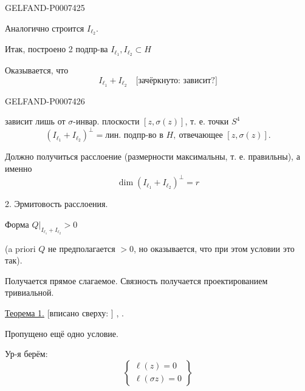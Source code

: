 \begin{GelfandAdjacentEvidence}{GELFAND-P000742}{5}


Аналогично строится \(I_{\ell_2}\).

Итак, построено 2 подпр-ва \(I_{\ell_1},I_{\ell_2}\subset H\)

Оказывается, что
\[
I_{\ell_1}+I_{\ell_2}\quad \text{[зачёркнуто: зависит?]}
\]
\end{GelfandAdjacentEvidence}
\begin{GelfandAdjacentEvidence}{GELFAND-P000742}{6}

зависит лишь от \(\sigma\)-инвар. плоскости \([z,\sigma(z)]\), т. е. точки \(S^4\)
\[
(I_{\ell_1}+I_{\ell_2})^\perp
=\text{лин. подпр-во в }H,\ \text{отвечающее }[z,\sigma(z)].
\]

 Должно получиться расслоение
(размерности максимальны, т. е. правильны), а именно
\begin{equation*}
\tag{19}
\dim(I_{\ell_1}+I_{\ell_2})^\perp=r
\end{equation*}

 2. Эрмитовость расслоения.

Форма \(Q|_{I_{\ell_1}+I_{\ell_2}}>0\)

(a priori \(Q\) не предполагается \(>0\), но оказывается, что при этом условии это так).

Получается прямое слагаемое. Связность получается проектированием тривиальной.

\underline{Теорема 1.}  [вписано сверху: ]
, .
\end{GelfandAdjacentEvidence}


Пропущено ещё одно условие.

Ур-я берём:
\[
\left\{\begin{array}{l}
\ell(z)=0\\
\ell(\sigma z)=0
\end{array}\right\}
\]


